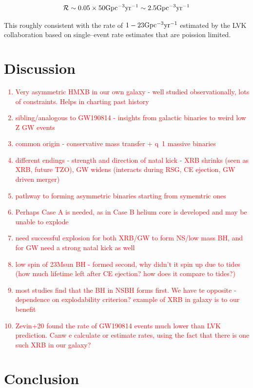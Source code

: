 \documentclass[linenumbers,trackchanges,twocolumn]{aastex701}
\newcommand{\red}{\textcolor{red}}
\begin{document}
 \begin{equation}
    \rm \mathcal{R} \sim 0.05 \times 50 Gpc^{-3} yr^{-1} \sim 2.5 Gpc^{-3} yr^{-1}
 \end{equation}

 This roughly consistent with the rate of $\rm 1-23 Gpc^{-3} yr^{-1}$ estimated by the LVK collaboration based on single--event rate estimates   that are poission limited.


\section{Discussion} \label{sec:highlight}

\red{
\begin{enumerate}
    \item Very asymmetric HMXB in our own galaxy - well studied observationally, lots of constraints. Helps in charting past history
    \item sibling/analogous to GW190814 - insights from galactic binaries to weird low Z GW events
    \item common origin - conservative mass transfer + q~1 massive binaries
    \item different endings - strength and direction of natal kick - XRB shrinks (seen as XRB, future TZO), GW widens (interacts during RSG, CE ejection, GW driven merger)
    \item pathway to forming asymmetric binaries starting from symemtric ones
    \item Perhaps Case A is needed, as in Case B helium core is developed and may be unable to explode
    \item need successful explosion for both XRB/GW to form NS/low mass BH, and for GW need a strong natal kick as well
    \item low spin of 23Msun BH - formed second, why didn't it spin up due to tides (how much lifetime left after CE ejection? how does it compare to tides?)
    \item most studies find that the BH in NSBH forms first. We have te opposite - dependence on explodability criterion? example of XRB in galaxy is to our benefit
    \item Zevin+20 found the rate of GW190814 events much lower than LVK prediction. Canw e calculate or estimate rates, using the fact that there is one such XRB in our galaxy?
\end{enumerate}
}

\section{Conclusion} \label{sec:cite}
\end{document}
